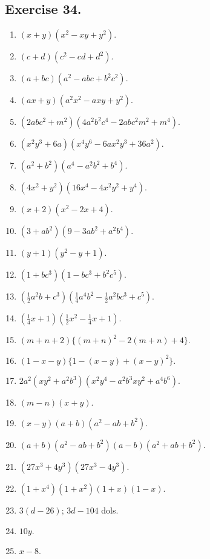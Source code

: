 \documentclass{book}
\begin{document}
\subsection*{Exercise 34.}

\begin{enumerate}

\item $(x + y)(x^2 - xy + y^2)$.
\item $(c + d)(c^2 - cd + d^2)$.
\item $(a + bc)(a^2 - abc + b^2c^2)$.
\item $(ax + y)(a^2x^2 - axy + y^2)$.
\item $(2abc^2 + m^2)(4a^2b^2c^4 - 2 abc^2m^2 + m^4)$.
\item $(x^2y^3 + 6a)(x^4y^6 - 6ax^2y^3 + 36a^2)$.
\item $(a^2 + b^2)(a^4 - a^2b^2 + b^4)$.
\item $(4x^2+y^2)(16x^4 - 4x^2y^2 + y^4)$.
\item $(x + 2)(x^2 - 2x + 4)$.
\item $(3 + ab^2)(9 -3ab^2 + a^2b^4)$.
\item $(y + 1)(y^2 - y + 1)$.
\item $(1 + bc^3)(1 - bc^3 + b^2c^5)$.
\item $(\frac{1}{2}a^2b + c^3)(\frac{1}{4}a^4b^2
                           - \frac{1}{2}a^2bc^3 + c^5)$.

\item $(\frac{1}{4}x + 1)(\frac{1}{2}x^2 - \frac{1}{4}x + 1)$.

\item $(m + n + 2)\{(m + n)^2 - 2(m + n) + 4\}$.

\item $(1 - x - y)\{1 - (x - y) + (x - y)^2\}$.

\item $2a^2(xy^2 + a^2b^3) (x^2y^4 - a^2b^3xy^2 + a^4b^6)$.

\item $(m - n)(x + y)$.

\item $(x  - y)(a + b)(a^2 - ab + b^2)$.

\item $(a + b)(a^2 - ab + b^2)(a - b)(a^2 + ab + b^2)$.

\item $(27x^3 + 4y^3)(27x^3 - 4y^3)$.

\item $(1 + x^4)(1 + x^2)(1 + x)(1 - x)$.

\item $3(d-26)$; $3d - 104$ dols.

\item $10y$.

\item $x - 8$.

\end{enumerate}
\end{document}
